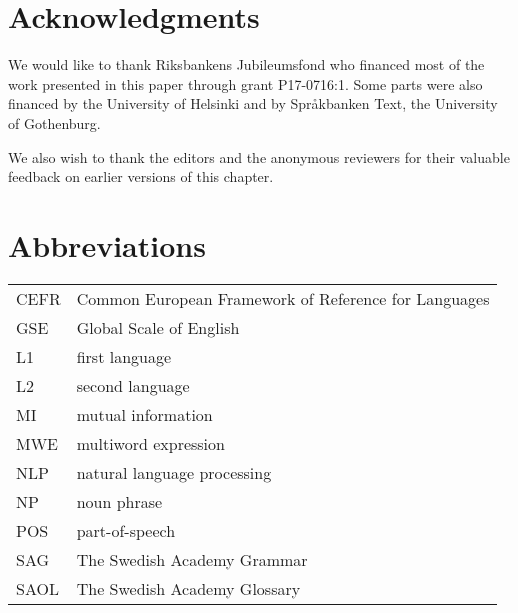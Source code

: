 \documentclass[output=paper,colorlinks,citecolor=brown]{langscibook}
\begin{document}
\section*{Acknowledgments}
We would like to thank Riksbankens Jubileumsfond who financed most of the work presented in this paper through grant P17-0716:1. Some parts were also financed by the University of Helsinki and by Språkbanken Text, the University of Gothenburg.

We also wish to thank the editors and the anonymous reviewers for their valuable feedback on earlier versions of this chapter.

\section*{Abbreviations}
\begin{tabularx}{\textwidth}{@{}lQ@{}}
CEFR & Common European Framework of Reference for Languages\\
GSE & Global Scale of English\\
L1 & first language\\
L2 & second language\\
MI & mutual information\\
MWE & multiword expression\\
NLP & natural language processing\\
NP & noun phrase\\
POS & part-of-speech\\
SAG & The Swedish Academy Grammar \citep[][]{teleman1999svenska}{}{}\\
SAOL & The Swedish Academy Glossary \citep[][]{akademien2015svenska}{}{}\\
\end{tabularx}


{\sloppy\printbibliography[heading=subbibliography,notkeyword=this]}
\end{document}
